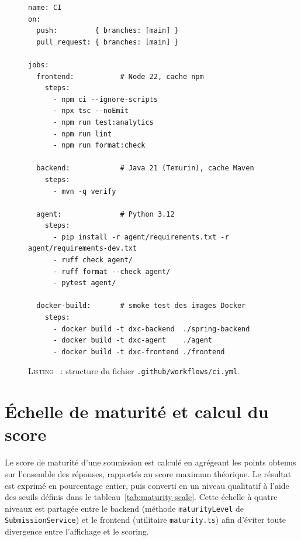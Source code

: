 \documentclass[12pt,a4paper]{report}
\begin{document}
\begin{figure}[H]
\centering
\begin{minipage}{0.95\textwidth}
\small
\begin{verbatim}
name: CI
on:
  push:         { branches: [main] }
  pull_request: { branches: [main] }

jobs:
  frontend:           # Node 22, cache npm
    steps:
      - npm ci --ignore-scripts
      - npx tsc --noEmit
      - npm run test:analytics
      - npm run lint
      - npm run format:check

  backend:            # Java 21 (Temurin), cache Maven
    steps:
      - mvn -q verify

  agent:              # Python 3.12
    steps:
      - pip install -r agent/requirements.txt -r agent/requirements-dev.txt
      - ruff check agent/
      - ruff format --check agent/
      - pytest agent/

  docker-build:       # smoke test des images Docker
    steps:
      - docker build -t dxc-backend  ./spring-backend
      - docker build -t dxc-agent    ./agent
      - docker build -t dxc-frontend ./frontend
\end{verbatim}
\end{minipage}
\label{lst:ci}
\caption*{\textsc{Listing \thefigure}~: structure du fichier \texttt{.github/workflows/ci.yml}.}
\end{figure}

\section{Échelle de maturité et calcul du score}
Le score de maturité d'une soumission est calculé en agrégeant les points obtenus sur l'ensemble des réponses, rapportés au score maximum théorique. Le résultat est exprimé en pourcentage entier, puis converti en un niveau qualitatif à l'aide des seuils définis dans le tableau~\ref{tab:maturity-scale}. Cette échelle à quatre niveaux est partagée entre le backend (méthode \texttt{maturityLevel} de \texttt{SubmissionService}) et le frontend (utilitaire \texttt{maturity.ts}) afin d'éviter toute divergence entre l'affichage et le scoring.
\end{document}

